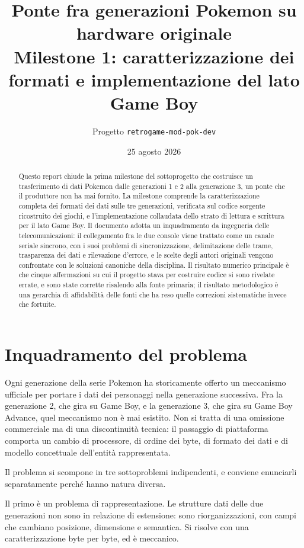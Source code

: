 \documentclass[11pt,a4paper]{article}
\title{\textbf{Ponte fra generazioni Pokemon su hardware originale}\\[0.3em]
\large Milestone 1: caratterizzazione dei formati e implementazione del lato Game Boy}
\author{Progetto \texttt{retrogame-mod-pok-dev}}
\date{25 agosto 2026}
\begin{document}
\maketitle

\begin{abstract}
\noindent Questo report chiude la prima milestone del sottoprogetto che costruisce un trasferimento di dati Pokemon dalle generazioni 1 e 2 alla generazione 3, un ponte che il produttore non ha mai fornito. La milestone comprende la caratterizzazione completa dei formati dei dati sulle tre generazioni, verificata sul codice sorgente ricostruito dei giochi, e l'implementazione collaudata dello strato di lettura e scrittura per il lato Game Boy. Il documento adotta un inquadramento da ingegneria delle telecomunicazioni: il collegamento fra le due console viene trattato come un canale seriale sincrono, con i suoi problemi di sincronizzazione, delimitazione delle trame, trasparenza dei dati e rilevazione d'errore, e le scelte degli autori originali vengono confrontate con le soluzioni canoniche della disciplina. Il risultato numerico principale è che cinque affermazioni su cui il progetto stava per costruire codice si sono rivelate errate, e sono state corrette risalendo alla fonte primaria; il risultato metodologico è una gerarchia di affidabilità delle fonti che ha reso quelle correzioni sistematiche invece che fortuite.
\end{abstract}

\tableofcontents

\section{Inquadramento del problema}

Ogni generazione della serie Pokemon ha storicamente offerto un meccanismo ufficiale per portare i dati dei personaggi nella generazione successiva. Fra la generazione 2, che gira su Game Boy, e la generazione 3, che gira su Game Boy Advance, quel meccanismo non è mai esistito. Non si tratta di una omissione commerciale ma di una discontinuità tecnica: il passaggio di piattaforma comporta un cambio di processore, di ordine dei byte, di formato dei dati e di modello concettuale dell'entità rappresentata.

Il problema si scompone in tre sottoproblemi indipendenti, e conviene enunciarli separatamente perché hanno natura diversa.

Il primo è un problema di rappresentazione. Le strutture dati delle due generazioni non sono in relazione di estensione: sono riorganizzazioni, con campi che cambiano posizione, dimensione e semantica. Si risolve con una caratterizzazione byte per byte, ed è meccanico.
\end{document}
